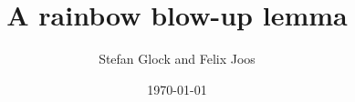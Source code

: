 \documentclass[10pt]{amsart}
\title[]{A rainbow blow-up lemma}
\date{\today}
\author[S.~Glock and F.~Joos]{Stefan Glock and Felix Joos}
\theoremstyle{definition}
\theoremstyle{claimstyle}
\theoremstyle{stepstyle}
\numberwithin{equation}{section}
\begin{document}
\newcommand{\new}[1]{\textcolor{red}{#1}}
\def\COMMENT#1{}
\def\TASK#1{}

\newcommand{\todo}[1]{\begin{center}\textbf{to do:} #1 \end{center}}




\def\eps{{\varepsilon}}
\newcommand{\ex}{\mathbb{E}}
\newcommand{\pr}{\mathbb{P}}
\newcommand{\cB}{\mathcal{B}}
\newcommand{\cA}{\mathcal{A}}
\newcommand{\cE}{\mathcal{E}}
\newcommand{\cS}{\mathcal{S}}
\newcommand{\cF}{\mathcal{F}}
\newcommand{\cG}{\mathcal{G}}
\newcommand{\bL}{\mathbb{L}}
\newcommand{\bF}{\mathbb{F}}
\newcommand{\bZ}{\mathbb{Z}}
\newcommand{\cH}{\mathcal{H}}
\newcommand{\cC}{\mathcal{C}}
\newcommand{\cM}{\mathcal{M}}
\newcommand{\bN}{\mathbb{N}}
\newcommand{\bR}{\mathbb{R}}
\def\O{\mathcal{O}}
\newcommand{\cP}{\mathcal{P}}
\newcommand{\cQ}{\mathcal{Q}}
\newcommand{\cR}{\mathcal{R}}
\newcommand{\cJ}{\mathcal{J}}
\newcommand{\cL}{\mathcal{L}}
\newcommand{\cK}{\mathcal{K}}
\newcommand{\cD}{\mathcal{D}}
\newcommand{\cI}{\mathcal{I}}
\newcommand{\cV}{\mathcal{V}}
\newcommand{\cT}{\mathcal{T}}
\newcommand{\cU}{\mathcal{U}}
\newcommand{\cX}{\mathcal{X}}
\newcommand{\cZ}{\mathcal{Z}}
\newcommand{\1}{{\bf 1}_{n\not\equiv \delta}}
\newcommand{\eul}{{\rm e}}
\newcommand{\Erd}{Erd\H{o}s}
\newcommand{\cupdot}{\mathbin{\mathaccent\cdot\cup}}
\newcommand{\whp}{whp }
\newcommand{\bX}{\mathcal{X}}
\newcommand{\bV}{\mathcal{V}}


\newcommand{\doublesquig}{%
  \mathrel{%
    \vcenter{\offinterlineskip
      \ialign{##\cr$\rightsquigarrow$\cr\noalign{\kern-1.5pt}$\rightsquigarrow$\cr}%
    }%
  }%
}

\newcommand{\defn}{\emph}

\newcommand\restrict[1]{\raisebox{-.5ex}{$|$}_{#1}}

\newcommand{\prob}[1]{\mathrm{\mathbb{P}}\left[#1\right]}
\newcommand{\expn}[1]{\mathrm{\mathbb{E}}\left[#1\right]}
\def\gnp{G_{n,p}}
\def\G{\mathcal{G}}
\def\lflr{\left\lfloor}
\def\rflr{\right\rfloor}
\def\lcl{\left\lceil}
\def\rcl{\right\rceil}

\newcommand{\qbinom}[2]{\binom{#1}{#2}_{\!q}}
\newcommand{\binomdim}[2]{\binom{#1}{#2}_{\!\dim}}

\newcommand{\grass}{\mathrm{Gr}}

\newcommand{\brackets}[1]{\left(#1\right)}
\def\sm{\setminus}
\newcommand{\Set}[1]{\{#1\}}
\newcommand{\set}[2]{\{#1\,:\;#2\}}
\newcommand{\krq}[2]{K^{(#1)}_{#2}}
\newcommand{\ind}[1]{$\mathbf{S}(#1)$}
\newcommand{\indcov}[1]{$(\#)_{#1}$}
\def\In{\subseteq}
\end{document}
